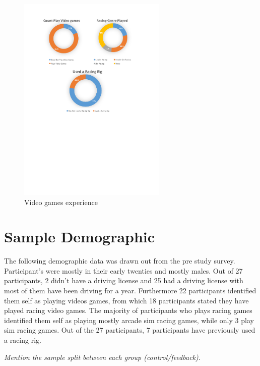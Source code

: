 
\begin{figure}[!htb]
	\centering
	\includegraphics[height=10cm]{charts/gamesxp.pdf}
	\caption[Gaming xp]{Video games experience}
	\label{fig:chart-gamesxp}
\end{figure}

\section{Sample Demographic}
\label{sec:eval-demographic}

The following demographic data was drawn out from the pre study survey. Participant's were mostly in their early twenties and mostly males. Out of 27 participants, 2 didn't have a driving license and 25 had a driving license with most of them have been driving for a year. Furthermore 22 participants identified them self as playing videos games, from which 18 participants stated they have played racing video games. The majority of participants who plays racing games identified them self as playing mostly arcade sim racing games, while only 3 play sim racing games. Out of the 27 participants, 7 participants have previously used a racing rig. 

\emph{Mention the sample split between each group (control/feedback).}


